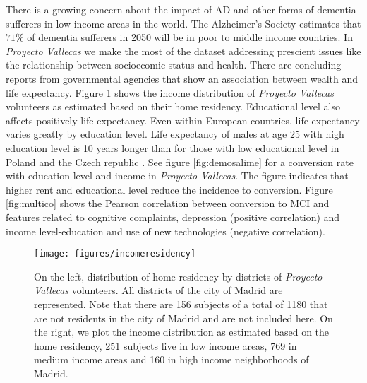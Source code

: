 \documentclass[11pt]{article}
\theoremstyle{definition}
\theoremstyle{remark}
\begin{document}
There is a growing concern about the impact of AD and other forms of dementia sufferers in low income areas in the world.
The Alzheimer’s Society estimates that $71\%$ of dementia sufferers in 2050 will be in poor to middle income countries.
In \emph{Proyecto Vallecas} we make the most of the dataset addressing prescient issues like the relationship between socioecomic status and health. There are concluding reports from governmental agencies that show an association between wealth and life expectancy. 
Figure \ref{fig:incomeresidency} shows the income distribution of \emph{Proyecto Vallecas} volunteers as estimated based on their home residency. 
Educational level also affects positively life expectancy. Even within European countries, life expectancy varies greatly by education level. Life expectancy of males at age 25 with high education level is 10 years longer than for those with low educational level in Poland and the Czech republic \cite{imf2018}. 
See figure \ref{fig:demosalime} for a conversion rate with education level and income in \emph{Proyecto Vallecas}. The figure indicates that higher rent and educational level reduce the incidence to conversion. Figure \ref{fig:multico} shows the Pearson correlation between conversion to MCI and features related to cognitive complaints, depression (positive correlation) and income level-education and use of new technologies (negative correlation).

\begin{figure}[H]
        \centering
        \texttt{[image: figures/incomeresidency]}
        \caption{On the left, distribution of home residency by districts of \emph{Proyecto Vallecas} volunteers. All districts of the city of Madrid are represented. Note that there are 156 subjects of a total of 1180 that are not residents in the city of Madrid and are not included here. On the right, we plot the income distribution as estimated based on the home residency, 251 subjects live in low income areas, 769 in medium income areas and 160 in high income neighborhoods of Madrid.
        } \label{fig:incomeresidency}
\end{figure}
\end{document}
